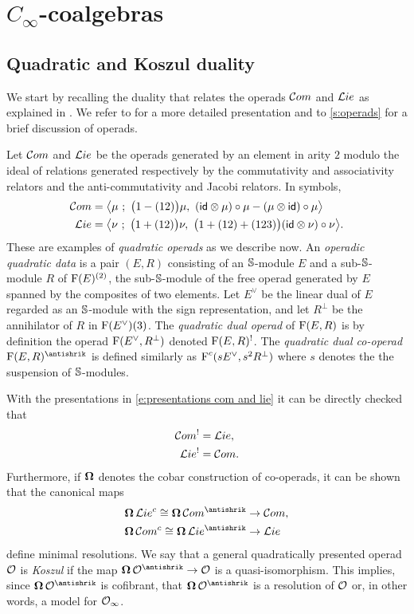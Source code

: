 
\section{$C_\infty$-coalgebras} \label{s:rationally}

\subsection{Quadratic and Koszul duality}

We start by recalling the duality that relates the operads $\mathcal{C}om$ and $\mathcal{L}ie$ as explained in \cite{ginzburg1994koszul}.
We refer to \cite[Ch.~7,~10]{loday2012operads} for a more detailed presentation and to \cref{s:operads} for a brief discussion of operads.

Let $\mathcal{C}om$ and $\mathcal{L}ie$ be the operads generated by an element in arity $2$ modulo the ideal of relations generated respectively by the commutativity and associativity relators and the anti-commutativity and Jacobi relators.
In symbols,
\begin{align} \label{e:presentations com and lie}
\mathcal{C}om &= \big\langle \mu \ ;\ \big(1 - (12)\big) \mu, \ (\mathsf{id} \otimes \mu) \circ \mu - (\mu \otimes \mathsf{id}) \circ \mu \big\rangle \\
\mathcal{L}ie &= \big\langle \nu \ ;\ \big(1 + (12)\big) \nu, \ \big( 1 + (12) + (123) \big) (\mathsf{id} \otimes \nu) \circ \nu \big\rangle.
\end{align}
These are examples of \textit{quadratic operads} as we describe now.
An \textit{operadic quadratic data} is a pair $(E, R)$ consisting of an $\mathbb{S}$-module $E$ and a sub-$\mathbb{S}$-module $R$ of $\operatorname{F}(E)^{(2)}$, the sub-$\mathbb{S}$-module of the free operad generated by $E$ spanned by the composites of two elements.
Let $E^\vee$ be the linear dual of $E$ regarded as an $\mathbb{S}$-module with the sign representation, and let $R^\perp$ be the annihilator of $R$ in $\operatorname{F}(E^\vee)(3)$.
The \textit{quadratic dual operad} of $\operatorname{F}(E, R)$ is by definition the operad $\operatorname{F}(E^\vee, R^\perp)$ denoted $\operatorname{F}(E, R)^!$.
The \textit{quadratic dual co-operad} $\free(E, R)^\antishrik$ is defined similarly as $\operatorname{F}^c(s E^\vee, s^2 R^\perp)$ where $s$ denotes the the suspension of $\mathbb{S}$-modules.

With the presentations in \eqref{e:presentations com and lie} it can be directly checked that
\begin{align*}
\mathcal{C}om^! &= \mathcal{L}ie, \\
\mathcal{L}ie^! &= \mathcal{C}om.
\end{align*}
Furthermore, if $\operatorname{\mathbf{\Omega}}$ denotes the cobar construction of co-operads, it can be shown that the canonical maps
\begin{align*}
\cobar \lie^\c \cong \cobar \com^\antishrik &\to \com, \\
\cobar \com^\c \cong \cobar \lie^\antishrik &\to \lie
\end{align*}
define minimal resolutions.
We say that a general quadratically presented operad $\mathcal{O}$ is \textit{Koszul} if the map $\cobar \cO^\antishrik \to \cO$ is a quasi-isomorphism.
This implies, since $\cobar \cO^\antishrik$ is cofibrant, that $\cobar \cO^\antishrik$ is a resolution of $\mathcal{O}$ or, in other words, a model for $\mathcal{O}_\infty$.

